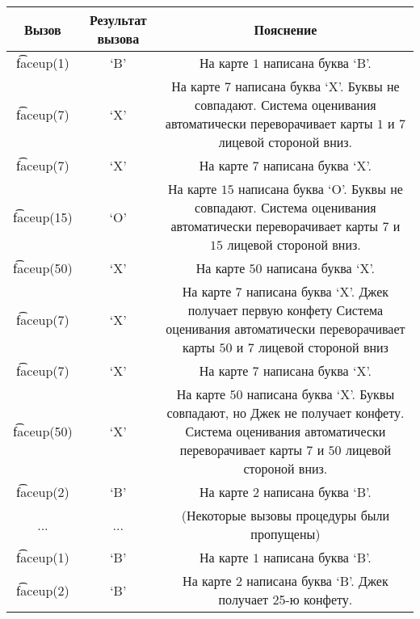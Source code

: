 \begin{tabular}{|c|c|c|}
\hline
Вызов & Результат вызова & Пояснение\\ \hline
\t{faceup(1) }& `B' &  На карте $1$ написана буква `B'. \\ \hline
\t{faceup(7) }& `X' &  \parbox{10cm}{\centering \vspace{2mm}На карте $7$ написана буква `X'. Буквы не совпадают. Система оценивания автоматически переворачивает карты $1$ и $7$ лицевой стороной вниз.\\\vspace{2mm}}
 \\ \hline
\t{faceup(7) }& `X' &  На карте $7$ написана буква `X'. \\ \hline
\t{faceup(15)} & `O' & \parbox{10cm}{\centering \vspace{2mm}На карте $15$ написана буква `O'. Буквы не совпадают. Система оценивания автоматически переворачивает карты $7$ и $15$ лицевой стороной вниз.\\\vspace{2mm}}
 \\ \hline
\t{faceup(50)} & `X' & На карте $50$ написана буква `X'. \\ \hline
\t{faceup(7) }& `X' &  \parbox{10cm}{\centering \vspace{2mm}На карте $7$ написана буква `X'. Джек получает первую конфету Система оценивания автоматически переворачивает карты $50$ и $7$ лицевой стороной вниз\\\vspace{2mm}}
\\ \hline
\t{faceup(7) }& `X' &  На карте $7$ написана буква `X'. \\ \hline
\t{faceup(50)} & `X' & \parbox{10cm}{\centering \vspace{2mm}На карте $50$ написана буква `X'. Буквы совпадают,
но Джек не получает конфету. Система оценивания автоматически переворачивает карты  $7$ и $50$ лицевой стороной вниз. \\\vspace{2mm}}\\ \hline
\t{faceup(2) }& `B' &  На карте $2$ написана буква `B'. \\ \hline
... & ... & (Некоторые вызовы процедуры были пропущены) \\ \hline
\t{faceup(1) }& `B' &  На карте $1$ написана буква `B'. \\ \hline
\t{faceup(2) }& `B' &  На карте $2$ написана буква `B'. Джек получает 25-ю конфету. \\ \hline
\end{tabular}